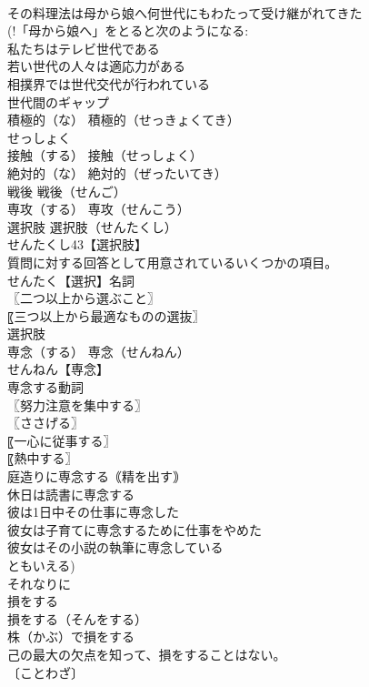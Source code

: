 \documentclass[8pt]{extreport}
\begin{document}
\begin{CJK}{UTF8}{min}
\\	その料理法は母から娘へ何世代にもわたって受け継がれてきた
\\	(!「母から娘へ」をとると次のようになる: 
\\	私たちはテレビ世代である
\\	若い世代の人々は適応力がある
\\	相撲界では世代交代が行われている
\\	世代間のギャップ
\\	積極的（な）		積極的（せっきょくてき）
\\	せっしょく
\\	接触（する）		接触（せっしょく）
\\	絶対的（な）		絶対的（ぜったいてき）
\\	戦後		戦後（せんご）
\\	専攻（する）		専攻（せんこう）
\\	選択肢		選択肢（せんたくし）
\\	せんたくし43【選択肢】
\\	質問に対する回答として用意されているいくつかの項目。
\\	せんたく【選択】名詞
\\	〖二つ以上から選ぶこと〗
\\	〖三つ以上から最適なものの選抜〗
\\	選択肢
\\	専念（する）		専念（せんねん）
\\	せんねん【専念】
\\	専念する動詞
\\	〖努力注意を集中する〗
\\	〖ささげる〗
\\	〖一心に従事する〗
\\	〖熱中する〗
\\	庭造りに専念する｟精を出す｠
\\	休日は読書に専念する
\\	彼は1日中その仕事に専念した
\\	彼女は子育てに専念するために仕事をやめた
\\	彼女はその小説の執筆に専念している
\\	ともいえる)
\\	それなりに		
\\	損をする
\\	損をする（そんをする）
\\	株（かぶ）で損をする
\\	己の最大の欠点を知って、損をすることはない。
\\	〔ことわざ〕

\end{CJK}
\end{document}
